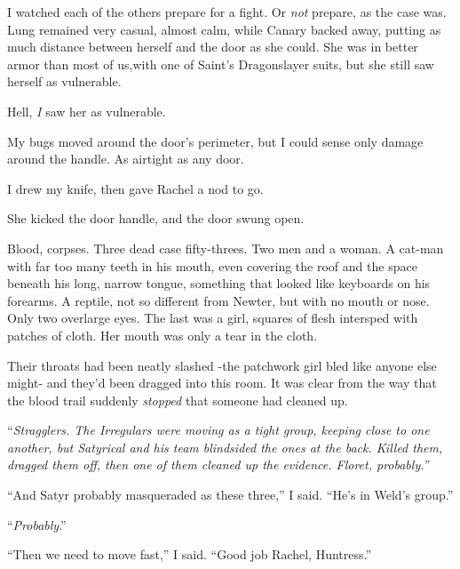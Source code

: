 I watched each of the others prepare for a fight.  Or \emph{not} prepare, as the case was.  Lung remained very casual, almost calm, while Canary backed away, putting as much distance between herself and the door as she could.  She was in better armor than most of us,with one of Saint's Dragonslayer suits, but she still saw herself as vulnerable.



Hell, \emph{I} saw her as vulnerable.



My bugs moved around the door's perimeter, but I could sense only damage around the handle.  As airtight as any door.



I drew my knife, then gave Rachel a nod to go.



She kicked the door handle, and the door swung open.



Blood, corpses.  Three dead case fifty-threes.  Two men and a woman.  A cat-man with far too many teeth in his mouth, even covering the roof and the space beneath his long, narrow tongue, something that looked like keyboards on his forearms.  A reptile, not so different from Newter, but with no mouth or nose.  Only two overlarge eyes.  The last was a girl, squares of flesh intersped with patches of cloth.  Her mouth was only a tear in the cloth.



Their throats had been neatly slashed -the patchwork girl bled like anyone else might- and they'd been dragged into this room.  It was clear from the way that the blood trail suddenly \emph{stopped} that someone had cleaned up.



``\emph{Stragglers.  The Irregulars were moving as a tight group, keeping close to one another, but Satyrical and his team blindsided the ones at the back.  Killed them, dragged them off, then one of them cleaned up the evidence.  Floret, probably.''}



``And Satyr probably masqueraded as these three,'' I said.  ``He's in Weld's group.''



``\emph{Probably}.''



``Then we need to move fast,'' I said.  ``Good job Rachel, Huntress.''



